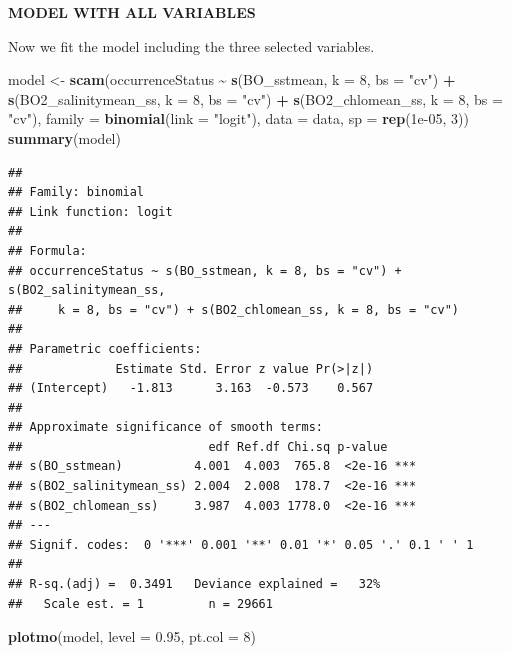 \documentclass[
]{book}
\newenvironment{Shaded}{\begin{snugshade}}{\end{snugshade}}
\newcommand{\AttributeTok}[1]{\textcolor[rgb]{0.13,0.29,0.53}{#1}}
\newcommand{\DecValTok}[1]{\textcolor[rgb]{0.00,0.00,0.81}{#1}}
\newcommand{\FloatTok}[1]{\textcolor[rgb]{0.00,0.00,0.81}{#1}}
\newcommand{\FunctionTok}[1]{\textcolor[rgb]{0.13,0.29,0.53}{\textbf{#1}}}
\newcommand{\NormalTok}[1]{#1}
\newcommand{\OtherTok}[1]{\textcolor[rgb]{0.56,0.35,0.01}{#1}}
\newcommand{\SpecialCharTok}[1]{\textcolor[rgb]{0.81,0.36,0.00}{\textbf{#1}}}
\newcommand{\StringTok}[1]{\textcolor[rgb]{0.31,0.60,0.02}{#1}}
\begin{document}
\textbf{MODEL WITH ALL VARIABLES}

Now we fit the model including the three selected variables.

\begin{Shaded}
\begin{Highlighting}[]
\NormalTok{model }\OtherTok{\textless{}{-}} \FunctionTok{scam}\NormalTok{(occurrenceStatus }\SpecialCharTok{\textasciitilde{}} \FunctionTok{s}\NormalTok{(BO\_sstmean,}
    \AttributeTok{k =} \DecValTok{8}\NormalTok{, }\AttributeTok{bs =} \StringTok{"cv"}\NormalTok{) }\SpecialCharTok{+} \FunctionTok{s}\NormalTok{(BO2\_salinitymean\_ss,}
    \AttributeTok{k =} \DecValTok{8}\NormalTok{, }\AttributeTok{bs =} \StringTok{"cv"}\NormalTok{) }\SpecialCharTok{+} \FunctionTok{s}\NormalTok{(BO2\_chlomean\_ss,}
    \AttributeTok{k =} \DecValTok{8}\NormalTok{, }\AttributeTok{bs =} \StringTok{"cv"}\NormalTok{), }\AttributeTok{family =} \FunctionTok{binomial}\NormalTok{(}\AttributeTok{link =} \StringTok{"logit"}\NormalTok{),}
    \AttributeTok{data =}\NormalTok{ data, }\AttributeTok{sp =} \FunctionTok{rep}\NormalTok{(}\FloatTok{1e{-}05}\NormalTok{, }\DecValTok{3}\NormalTok{))}
\FunctionTok{summary}\NormalTok{(model)}
\end{Highlighting}
\end{Shaded}

\begin{verbatim}
## 
## Family: binomial 
## Link function: logit 
## 
## Formula:
## occurrenceStatus ~ s(BO_sstmean, k = 8, bs = "cv") + s(BO2_salinitymean_ss, 
##     k = 8, bs = "cv") + s(BO2_chlomean_ss, k = 8, bs = "cv")
## 
## Parametric coefficients:
##             Estimate Std. Error z value Pr(>|z|)
## (Intercept)   -1.813      3.163  -0.573    0.567
## 
## Approximate significance of smooth terms:
##                          edf Ref.df Chi.sq p-value    
## s(BO_sstmean)          4.001  4.003  765.8  <2e-16 ***
## s(BO2_salinitymean_ss) 2.004  2.008  178.7  <2e-16 ***
## s(BO2_chlomean_ss)     3.987  4.003 1778.0  <2e-16 ***
## ---
## Signif. codes:  0 '***' 0.001 '**' 0.01 '*' 0.05 '.' 0.1 ' ' 1
## 
## R-sq.(adj) =  0.3491   Deviance explained =   32%
##   Scale est. = 1         n = 29661
\end{verbatim}

\begin{Shaded}
\begin{Highlighting}[]
\FunctionTok{plotmo}\NormalTok{(model, }\AttributeTok{level =} \FloatTok{0.95}\NormalTok{, }\AttributeTok{pt.col =} \DecValTok{8}\NormalTok{)}
\end{Highlighting}
\end{Shaded}
\end{document}
